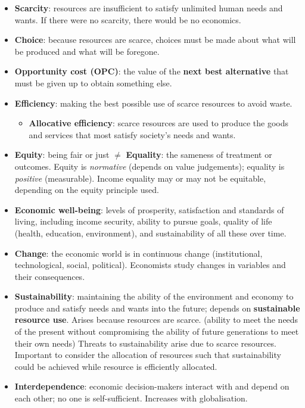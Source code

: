 \documentclass[a4paper,12pt]{article}
\begin{document}
\begin{itemize}
  \item \textbf{Scarcity}: resources are insufficient to satisfy unlimited human needs and wants. If there were no scarcity, there would be no economics.
  \item \textbf{Choice}: because resources are scarce, choices must be made about what will be produced and what will be foregone.
  \item \textbf{Opportunity cost (OPC)}: the value of the \textbf{next best alternative} that must be given up to obtain something else.
  \item \textbf{Efficiency}: making the best possible use of scarce resources to avoid waste.
  \begin{itemize}
    \item \textbf{Allocative efficiency}: scarce resources are used to produce the goods and services that most satisfy society's needs and wants.
  \end{itemize}
  \item \textbf{Equity}: being fair or just $\neq$ \textbf{Equality}: the sameness of treatment or outcomes. Equity is \textit{normative} (depends on value judgements); equality is \textit{positive} (measurable). Income equality may or may not be equitable, depending on the equity principle used.
  \item \textbf{Economic well-being}: levels of prosperity, satisfaction and standards of living, including income security, ability to pursue goals, quality of life (health, education, environment), and sustainability of all these over time.
  \item \textbf{Change}: the economic world is in continuous change (institutional, technological, social, political). Economists study changes in variables and their consequences.
  \item \textbf{Sustainability}: maintaining the ability of the environment and economy to produce and satisfy needs and wants into the future; depends on \textbf{sustainable resource use}. Arises because resources are scarce. (ability to meet the needs of the present without compromising the ability of future generations to meet their own needs) Threats to sustainability arise due to scarce resources. Important to consider the allocation of resources such that sustainability could be achieved while resource is efficiently allocated.
  \item \textbf{Interdependence}: economic decision-makers interact with and depend on each other; no one is self-sufficient. Increases with globalisation.

\end{itemize}
\end{document}
